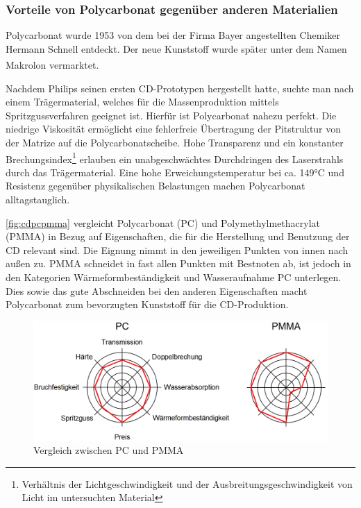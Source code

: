 \subsubsection{Vorteile von Polycarbonat gegenüber anderen Materialien}

Polycarbonat wurde 1953 von dem bei der Firma Bayer angestellten Chemiker
Hermann Schnell entdeckt. Der neue Kunststoff wurde später unter dem Namen
Makrolon\textsuperscript{\textregistered} vermarktet. \cite{cuzpc}

Nachdem Philips seinen ersten CD-Prototypen hergestellt hatte, suchte man nach
einem Trägermaterial, welches für die Massenproduktion mittels
Spritzgussverfahren geeignet ist. Hierfür ist Polycarbonat nahezu perfekt. Die
niedrige Viskosität ermöglicht eine fehlerfreie Übertragung der Pitstruktur von
der Matrize auf die Polycarbonatscheibe. Hohe Transparenz und ein konstanter
Brechungsindex\footnote{Verhältnis der Lichtgeschwindigkeit und der
Ausbreitungsgeschwindigkeit von Licht im untersuchten Material} erlauben ein
unabgeschwächtes Durchdringen des Laserstrahls durch das Trägermaterial. Eine
hohe Erweichungstemperatur bei ca. 149°C \cite{cuzpc2} und Resistenz gegenüber
physikalischen Belastungen machen Polycarbonat alltagstauglich. \cite{cfcd}

\autoref{fig:cdpcpmma} vergleicht Polycarbonat (PC) und Polymethylmethacrylat
(PMMA) in Bezug auf Eigenschaften, die für die Herstellung und Benutzung der CD
relevant sind. Die Eignung nimmt in den jeweiligen Punkten von innen nach außen
zu. PMMA schneidet in fast allen Punkten mit Bestnoten ab, ist jedoch in den
Kategorien Wärmeformbeständigkeit und Wasseraufnahme PC unterlegen. Dies sowie
das gute Abschneiden bei den anderen Eigenschaften macht Polycarbonat zum
bevorzugten Kunststoff für die CD-Produktion.

\begin{figure}[h]
    \begin{center}
        \begin{minipage}[t]{\textwidth}
            \begin{center}
                \includegraphics[height=0.1\textheight]{Bilder/Optische_Datentraeger_Die_Compact_Disc/Material_Polycarbonat/cdpcpmma.png}
                \caption[Vergleich zwischen PC und PMMA \newline Roth, Klaus: CD, DVD \& Co.: Die Chemie der schillernden Scheiben, in: Chemie in unserer Zeit (41/2007), S. 337]{Vergleich zwischen PC und PMMA}
                \label{fig:cdpcpmma}
            \end{center}
        \end{minipage}
    \end{center}
\end{figure}
